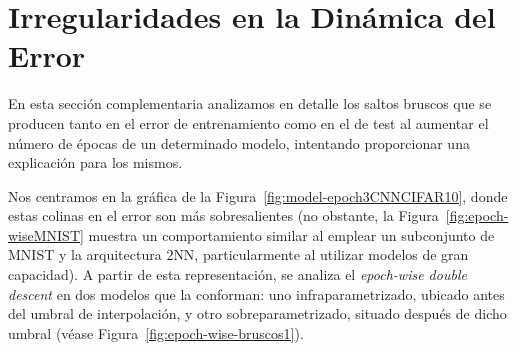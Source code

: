 
\chapter{Irregularidades en la Dinámica del Error}\label{ap:apendiceD}

En esta sección complementaria analizamos en detalle los saltos bruscos que se producen tanto en el error de entrenamiento como en el de test al aumentar el número de épocas de un determinado modelo, intentando proporcionar una explicación para los mismos.

Nos centramos en la gráfica de la Figura~\ref{fig:model-epoch3CNNCIFAR10}, donde estas colinas en el error son más sobresalientes (no obstante, la Figura~\ref{fig:epoch-wiseMNIST} muestra un comportamiento similar al emplear un subconjunto de MNIST y la arquitectura $2$NN, particularmente al utilizar modelos de gran capacidad). A partir de esta representación, se analiza el \textit{epoch-wise double descent} en dos modelos que la conforman: uno infraparametrizado, ubicado antes del umbral de interpolación, y otro sobreparametrizado, situado después de dicho umbral (véase Figura~\ref{fig:epoch-wise-bruscos1}).

